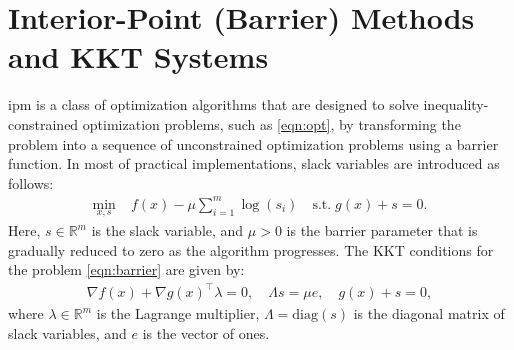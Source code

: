 \documentclass{article}
\begin{document}








\section{Interior-Point (Barrier) Methods and KKT Systems}\label{eqn:ipm}
\gls*{ipm} is a class of optimization algorithms that are designed to solve inequality-constrained optimization problems, such as \cref{eqn:opt}, by transforming the problem into a sequence of unconstrained optimization problems using a barrier function. In most of practical implementations, slack variables are introduced as follows:
\begin{align}\label{eqn:barrier}
  \min_{x,s } \; & f(x) - \mu \sum_{i=1}^m \log(s_i) \quad \text{s.t.} \; g(x) + s = 0.
\end{align}
Here, $s \in \mathbb{R}^m$ is the slack variable, and $\mu > 0$ is the barrier parameter that is gradually reduced to zero as the algorithm progresses.
The KKT conditions for the problem \cref{eqn:barrier} are given by:
\begin{align}\label{eqn:kkt}
  \nabla f(x) + \nabla g(x)^\top \lambda = 0, \quad
  \Lambda s  = \mu e,\quad
  g(x) + s =   0 ,
\end{align}
where $\lambda \in \mathbb{R}^m$ is the Lagrange multiplier, $\Lambda = \text{diag}(s)$ is the diagonal matrix of slack variables, and $e$ is the vector of ones.
\end{document}
